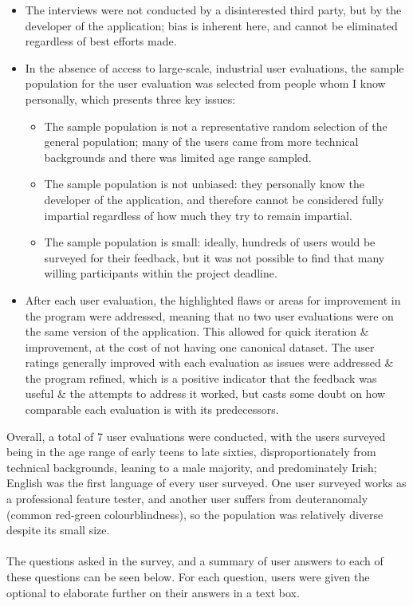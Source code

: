 \documentclass[a4paper,11pt]{report}
\begin{document}
\begin{itemize}
    \item   The interviews were not conducted by a disinterested third party, but by the developer of the application;
            bias is inherent here, and cannot be eliminated regardless of best efforts made.

    \item   In the absence of access to large-scale, industrial user evaluations, the sample population for the user evaluation was selected from people whom I know personally, which presents three key issues:
            \begin{itemize}
                \item   The sample population is not a representative random selection of the general population;
                        many of the users came from more technical backgrounds and there was limited age range sampled.

                \item   The sample population is not unbiased: they personally know the developer of the application, and therefore cannot be considered fully impartial regardless of how much they try to remain impartial.

                \item   The sample population is small: ideally, hundreds of users would be surveyed for their feedback, but it was not possible to find that many willing participants within the project deadline. 
            \end{itemize}

    \item   After each user evaluation, the highlighted flaws or areas for improvement in the program were addressed, meaning that no two user evaluations were on the same version of the application.
            This allowed for quick iteration \& improvement, at the cost of not having one canonical dataset.
            The user ratings generally improved with each evaluation as issues were addressed \& the program refined, which is a positive indicator that the feedback was useful \& the attempts to address it worked, but casts some doubt on how comparable each evaluation is with its predecessors.
\end{itemize}

Overall, a total of 7 user evaluations were conducted, with the users surveyed being in the age range of early teens to late sixties, disproportionately from technical backgrounds, leaning to a male majority, and predominately Irish;
English was the first language of every user surveyed.
One user surveyed works as a professional feature tester, and another user suffers from deuteranomaly\supercite{colourblind} (common red-green colourblindness), so the population was relatively diverse despite its small size.
\\\\
The questions asked in the survey, and a summary of user answers to each of these questions can be seen below.
For each question, users were given the optional to elaborate further on their answers in a text box.
\end{document}

